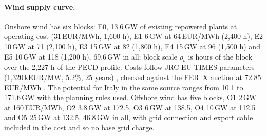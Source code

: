 \paragraph{Wind supply curve.} Onshore wind has six blocks: E0, 13.6\,GW of existing repowered plants at operating cost (31\,EUR/MWh, 1{,}600 h), E1 6\,GW at 64\,EUR/MWh (2{,}400 h), E2 10\,GW at 71 (2{,}100 h), E3 15\,GW at 82 (1{,}800 h), E4 15\,GW at 96 (1{,}500 h) and E5 10\,GW at 118 (1{,}200 h), 69.6\,GW in all; block scale $\rho_b$ is hours of the block over the 2{,}227 h of the PECD profile. Costs follow JRC-EU-TIMES parameters (1{,}320\,kEUR/MW, 5.2\%, 25 years) \citep{JRCEUTIMES}, checked against the FER~X auction at 72.85\,EUR/MWh \citep{FERXmain2025}. The potential for Italy in the same source ranges from 10.1 to 171.6\,GW with the planning rules used. Offshore wind has five blocks, O1 2\,GW at 160\,EUR/MWh, O2 3.8\,GW at 172.5, O3 6\,GW at 138.5, O4 10\,GW at 112.5 and O5 25\,GW at 132.5, 46.8\,GW in all, with grid connection and export cable included in the cost and so no base grid charge.

